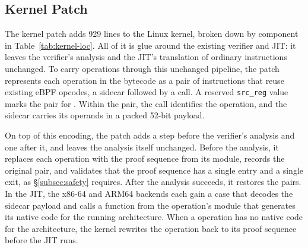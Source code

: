\subsection{Kernel Patch}
\label{subsec:kernel}

The kernel patch adds 929 lines to the Linux kernel, broken down by component in Table~\ref{tab:kernel-loc}.
All of it is glue around the existing verifier and JIT: it leaves the verifier's analysis and the JIT's translation of ordinary instructions unchanged.
To carry operations through this unchanged pipeline, the patch represents each \lang operation in the bytecode as a pair of instructions that reuse existing eBPF opcodes, a sidecar followed by a call.
A reserved \texttt{src\_reg} value marks the pair for \tool.
Within the pair, the call identifies the \lang operation, and the sidecar carries its operands in a packed 52-bit payload.



% 

On top of this encoding, the patch adds a step before the verifier's analysis and one after it, and leaves the analysis itself unchanged.
Before the analysis, it replaces each \lang operation with the proof sequence from its module, records the original pair, and validates that the proof sequence has a single entry and a single exit, as \S\ref{subsec:safety} requires.
After the analysis succeeds, it restores the pairs.
In the JIT, the x86-64 and ARM64 backends each gain a case that decodes the sidecar payload and calls a function from the \lang operation's module that generates its native code for the running architecture.
When a \lang operation has no native code for the architecture, the kernel rewrites the operation back to its proof sequence before the JIT runs.

